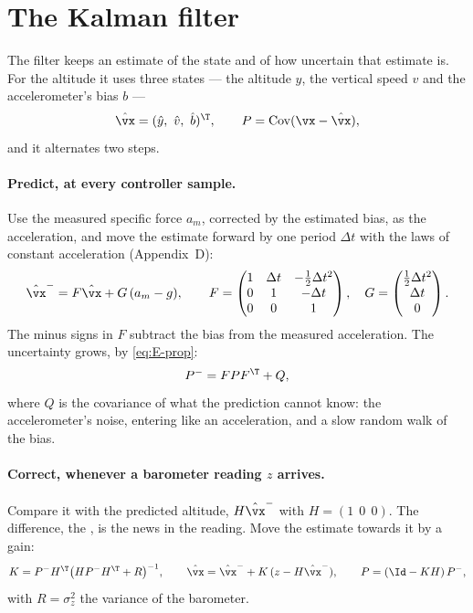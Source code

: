 \section{The Kalman filter}

The filter keeps an estimate of the state and of how uncertain that estimate is. For the altitude it uses three states — the altitude $y$, the vertical speed $v$ and the accelerometer's bias $b$ —
\begin{equation}
  \hat{\vx} = (\hat y,\ \hat v,\ \hat b)^\T, \qquad P = \operatorname{Cov}(\vx - \hat{\vx}) ,
\end{equation}
and it alternates two steps.

\paragraph{Predict, at every controller sample.} Use the measured specific force $a_m$, corrected by the estimated bias, as the acceleration, and move the estimate forward by one period $\Delta t$ with the laws of constant acceleration (Appendix~D):
\begin{equation}\label{eq:kalman-predict}
  \hat{\vx}^- = F\hat{\vx} + G\,(a_m - g), \qquad
  F = \begin{pmatrix} 1 & \Delta t & -\tfrac12\Delta t^2\\ 0 & 1 & -\Delta t\\ 0 & 0 & 1\end{pmatrix}, \quad
  G = \begin{pmatrix}\tfrac12\Delta t^2\\ \Delta t\\ 0\end{pmatrix} .
\end{equation}
The minus signs in $F$ subtract the bias from the measured acceleration. The uncertainty grows, by \cref{eq:E-prop}:
\begin{equation}\label{eq:kalman-Ppredict}
  P^- = F P F^\T + Q ,
\end{equation}
where $Q$ is the covariance of what the prediction cannot know: the accelerometer's noise, entering like an acceleration, and a slow random walk of the bias.

\paragraph{Correct, whenever a barometer reading $z$ arrives.} Compare it with the predicted altitude, $H\hat{\vx}^-$ with $H = (1\ \ 0\ \ 0)$. The difference, the , is the news in the reading. Move the estimate towards it by a gain:
\begin{equation}\label{eq:kalman-update}
  K = P^-H^\T\big(HP^-H^\T + R\big)^{-1}, \qquad
  \hat{\vx} = \hat{\vx}^- + K\,(z - H\hat{\vx}^-), \qquad
  P = (\Id - KH)\,P^- ,
\end{equation}
with $R = \sigma_z^2$ the variance of the barometer.

